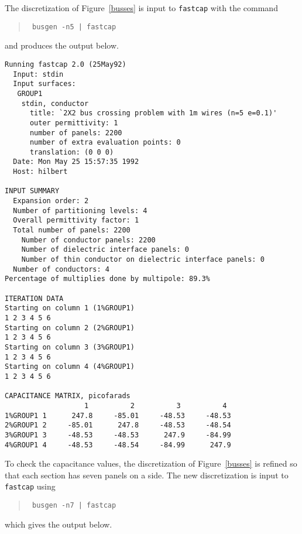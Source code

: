 The discretization of Figure~\ref{busses} is input to {\tt fastcap}
with the command
\begin{quote}\tt
busgen -n5 | fastcap
\end{quote}
and produces the output below.
\begin{verbatim}
Running fastcap 2.0 (25May92)
  Input: stdin
  Input surfaces:
   GROUP1
    stdin, conductor
      title: `2X2 bus crossing problem with 1m wires (n=5 e=0.1)'
      outer permittivity: 1
      number of panels: 2200
      number of extra evaluation points: 0
      translation: (0 0 0)
  Date: Mon May 25 15:57:35 1992
  Host: hilbert

INPUT SUMMARY
  Expansion order: 2
  Number of partitioning levels: 4
  Overall permittivity factor: 1
  Total number of panels: 2200
    Number of conductor panels: 2200
    Number of dielectric interface panels: 0
    Number of thin conductor on dielectric interface panels: 0
  Number of conductors: 4
Percentage of multiplies done by multipole: 89.3%

ITERATION DATA
Starting on column 1 (1%GROUP1)
1 2 3 4 5 6
Starting on column 2 (2%GROUP1)
1 2 3 4 5 6
Starting on column 3 (3%GROUP1)
1 2 3 4 5 6
Starting on column 4 (4%GROUP1)
1 2 3 4 5 6

CAPACITANCE MATRIX, picofarads
                   1          2          3          4
1%GROUP1 1      247.8     -85.01     -48.53     -48.53
2%GROUP1 2     -85.01      247.8     -48.53     -48.54
3%GROUP1 3     -48.53     -48.53      247.9     -84.99
4%GROUP1 4     -48.53     -48.54     -84.99      247.9
\end{verbatim}
To check the capacitance values, the discretization of Figure~\ref{busses}
is refined so that each section has seven panels on a side.
The new discretization is input to {\tt fastcap} using
\begin{quote}\tt
busgen -n7 | fastcap
\end{quote}
which gives the output below.

